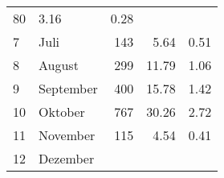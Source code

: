 \begin{longtable}{lXrrr}
       \num{80} &
       \num[round-mode=places,round-precision=2]{3,16} &
         \num[round-mode=places,round-precision=2]{0,28} \\

     7 &
     \multicolumn{1}{X}{ Juli   } &


       \num{143} &
       \num[round-mode=places,round-precision=2]{5,64} &
         \num[round-mode=places,round-precision=2]{0,51} \\

     8 &
     \multicolumn{1}{X}{ August   } &


       \num{299} &
       \num[round-mode=places,round-precision=2]{11,79} &
         \num[round-mode=places,round-precision=2]{1,06} \\

     9 &
     \multicolumn{1}{X}{ September   } &


       \num{400} &
       \num[round-mode=places,round-precision=2]{15,78} &
         \num[round-mode=places,round-precision=2]{1,42} \\

     10 &
     \multicolumn{1}{X}{ Oktober   } &


       \num{767} &
       \num[round-mode=places,round-precision=2]{30,26} &
         \num[round-mode=places,round-precision=2]{2,72} \\

     11 &
     \multicolumn{1}{X}{ November   } &


       \num{115} &
       \num[round-mode=places,round-precision=2]{4,54} &
         \num[round-mode=places,round-precision=2]{0,41} \\

     12 &
     \multicolumn{1}{X}{ Dezember   } &



\end{longtable}
